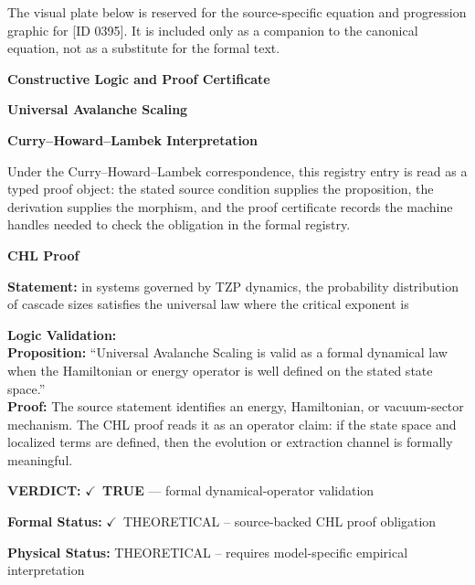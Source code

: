 \begingroup\footnotesize\sloppy
The visual plate below is reserved for the source-specific equation and progression graphic for [ID 0395]. It is included only as a companion to the canonical equation, not as a substitute for the formal text.
\par\endgroup
\ifTZPDarkEdition
{}
\fi

\clearpage
\begingroup\tzpsupportsetup
\noindent\textbf{\fontsize{10.8pt}{12.8pt}\selectfont [ID 0395] Constructive Logic and Proof Certificate}\par
\noindent\textbf{\fontsize{10pt}{12pt}\selectfont Universal Avalanche Scaling}\par
\vspace{0.45em}
\begingroup
\footnotesize
\setlength{\parskip}{0.22em}
\setlength{\parindent}{0pt}
\noindent\textbf{Curry--Howard--Lambek Interpretation}\par
Under the Curry--Howard--Lambek correspondence, this registry entry is read as a typed proof
object: the stated source condition supplies the proposition, the derivation supplies the
morphism, and the proof certificate records the machine handles needed to check the obligation
in the formal registry.

\vspace{0.45em}
\noindent\textbf{CHL Proof}\par
\textbf{Statement:} in systems governed by TZP dynamics, the probability distribution of cascade sizes
satisfies the universal law where the critical exponent is

\textbf{Logic Validation:}\\
\textbf{Proposition:} ``Universal Avalanche Scaling is valid as a formal dynamical law when the Hamiltonian or
energy operator is well defined on the stated state space.''\\
\textbf{Proof:} The source statement identifies an energy, Hamiltonian, or vacuum-sector mechanism. The
CHL proof reads it as an operator claim: if the state space and localized terms are
defined, then the evolution or extraction channel is formally meaningful.

\textbf{VERDICT:} \ensuremath{\checkmark}\ \textbf{TRUE} --- formal dynamical-operator validation

\textbf{Formal Status:} \ensuremath{\checkmark}\ THEORETICAL -- source-backed CHL proof obligation

\textbf{Physical Status:} THEORETICAL -- requires model-specific empirical interpretation
\par\vspace{0.45em}
\par
\ifTZPDarkEdition
{}
\fi
\endgroup
\endgroup
